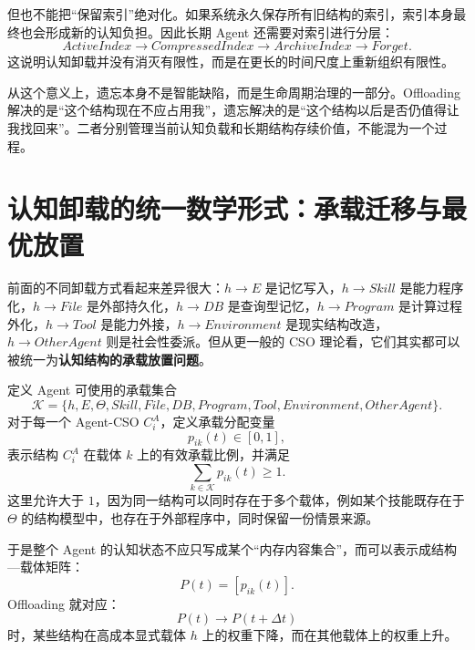 但也不能把“保留索引”绝对化。如果系统永久保存所有旧结构的索引，索引本身最终也会形成新的认知负担。因此长期 Agent 还需要对索引进行分层：
\begin{equation}
ActiveIndex
\rightarrow
CompressedIndex
\rightarrow
ArchiveIndex
\rightarrow
Forget.
\end{equation}
这说明认知卸载并没有消灭有限性，而是在更长的时间尺度上重新组织有限性。

从这个意义上，遗忘本身不是智能缺陷，而是生命周期治理的一部分。Offloading 解决的是“这个结构现在不应占用我”，遗忘解决的是“这个结构以后是否仍值得让我找回来”。二者分别管理当前认知负载和长期结构存续价值，不能混为一个过程。

\section{认知卸载的统一数学形式：承载迁移与最优放置}

前面的不同卸载方式看起来差异很大：$h\rightarrow E$ 是记忆写入，$h\rightarrow Skill$ 是能力程序化，$h\rightarrow File$ 是外部持久化，$h\rightarrow DB$ 是查询型记忆，$h\rightarrow Program$ 是计算过程外化，$h\rightarrow Tool$ 是能力外接，$h\rightarrow Environment$ 是现实结构改造，$h\rightarrow OtherAgent$ 则是社会性委派。但从更一般的 CSO 理论看，它们其实都可以被统一为\textbf{认知结构的承载放置问题}。

定义 Agent 可使用的承载集合
\begin{equation}
\mathcal K
=
\{
h,E,\Theta,Skill,File,DB,Program,Tool,Environment,OtherAgent
\}.
\end{equation}
对于每一个 Agent-CSO $C_i^A$，定义承载分配变量
\begin{equation}
p_{ik}(t)
\in[0,1],
\end{equation}
表示结构 $C_i^A$ 在载体 $k$ 上的有效承载比例，并满足
\begin{equation}
\sum_{k\in\mathcal K}p_{ik}(t)\geq1.
\end{equation}
这里允许大于 $1$，因为同一结构可以同时存在于多个载体，例如某个技能既存在于 $\Theta$ 的结构模型中，也存在于外部程序中，同时保留一份情景来源。

于是整个 Agent 的认知状态不应只写成某个“内存内容集合”，而可以表示成结构—载体矩阵：
\begin{equation}
P(t)
=
[p_{ik}(t)].
\end{equation}
Offloading 就对应：
\begin{equation}
P(t)
\rightarrow
P(t+\Delta t)
\end{equation}
时，某些结构在高成本显式载体 $h$ 上的权重下降，而在其他载体上的权重上升。

